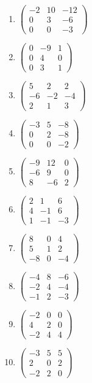 \begin{enumerate}[label=\arabic*., leftmargin=*]
\item $\begin{pmatrix}-2 & 10 & -12\\ 0 & 3 & -6\\ 0 & 0 & -3\end{pmatrix}$
\item $\begin{pmatrix}0 & -9 & 1\\ 0 & 4 & 0\\ 0 & 3 & 1\end{pmatrix}$
\item $\begin{pmatrix}5 & 2 & 2\\ -6 & -2 & -4\\ 2 & 1 & 3\end{pmatrix}$
\item $\begin{pmatrix}-3 & 5 & -8\\ 0 & 2 & -8\\ 0 & 0 & -2\end{pmatrix}$
\item $\begin{pmatrix}-9 & 12 & 0\\ -6 & 9 & 0\\ 8 & -6 & 2\end{pmatrix}$
\item $\begin{pmatrix}2 & 1 & 6\\ 4 & -1 & 6\\ 1 & -1 & -3\end{pmatrix}$
\item $\begin{pmatrix}8 & 0 & 4\\ 5 & 1 & 2\\ -8 & 0 & -4\end{pmatrix}$
\item $\begin{pmatrix}-4 & 8 & -6\\ -2 & 4 & -4\\ -1 & 2 & -3\end{pmatrix}$
\item $\begin{pmatrix}-2 & 0 & 0\\ 4 & 2 & 0\\ -2 & 4 & 4\end{pmatrix}$
\item $\begin{pmatrix}-3 & 5 & 5\\ 2 & 0 & 2\\ -2 & 2 & 0\end{pmatrix}$

\end{enumerate}
